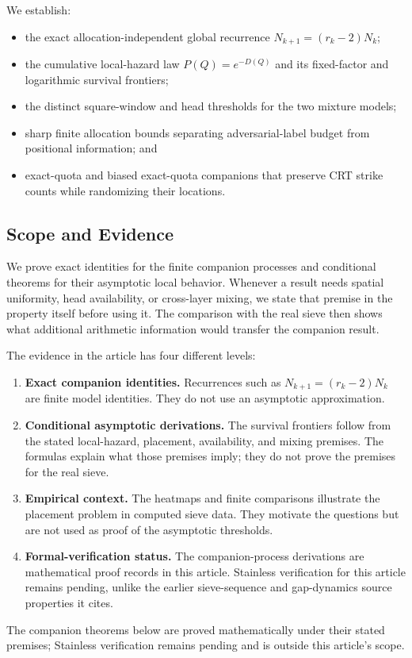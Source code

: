 We establish:
\begin{itemize}
\item the exact allocation-independent global recurrence $N_{k+1}=(r_k-2)N_k$;
\item the cumulative local-hazard law $P(Q)=e^{-D(Q)}$ and its fixed-factor and logarithmic survival frontiers;
\item the distinct square-window and head thresholds for the two mixture models;
\item sharp finite allocation bounds separating adversarial-label budget from positional information; and
\item exact-quota and biased exact-quota companions that preserve CRT strike counts while randomizing their locations.
\end{itemize}

\subsection{Scope and Evidence}
We prove exact identities for the finite companion processes and conditional theorems for their asymptotic local behavior. Whenever a result needs spatial uniformity, head availability, or cross-layer mixing, we state that premise in the property itself before using it. The comparison with the real sieve then shows what additional arithmetic information would transfer the companion result.

The evidence in the article has four different levels:
\begin{enumerate}
  \item \textbf{Exact companion identities.} Recurrences such as
    $N_{k+1}=(r_k-2)N_k$ are finite model identities. They do not use an
    asymptotic approximation.
  \item \textbf{Conditional asymptotic derivations.} The survival
    frontiers follow from the stated local-hazard, placement,
    availability, and mixing premises. The formulas explain what those
    premises imply; they do not prove the premises for the real sieve.
  \item \textbf{Empirical context.} The heatmaps and finite comparisons
    illustrate the placement problem in computed sieve data. They motivate
    the questions but are not used as proof of the asymptotic thresholds.
  \item \textbf{Formal-verification status.} The companion-process
    derivations are mathematical proof records in this article. Stainless
    verification for this article remains pending, unlike the earlier
    sieve-sequence and gap-dynamics source properties it cites.
\end{enumerate}
The companion theorems below are proved mathematically under their stated premises; Stainless verification remains pending and is outside this article's scope.
